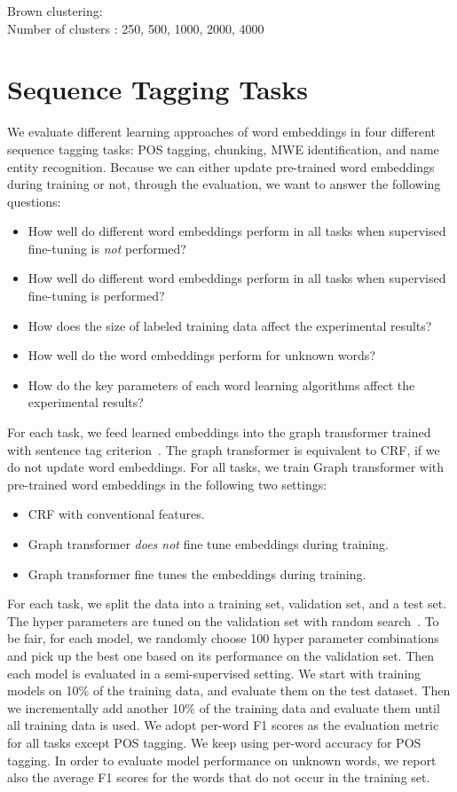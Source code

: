 \documentclass[11pt]{article}
\begin{document}
\noindent
Brown clustering:\\
\noindent
Number of clusters : 250, 500, 1000, 2000, 4000 


\section{Sequence Tagging Tasks}
We evaluate different learning approaches of word embeddings in four different sequence tagging tasks: POS tagging, chunking, MWE identification, and name entity recognition. Because we can either update pre-trained word embeddings during training or not, through the evaluation, we want to answer the following questions:
\begin{itemize}
\item How well do different word embeddings perform in all tasks when supervised fine-tuning is \textit{not} performed?
\item How well do different word embeddings perform in all tasks when supervised fine-tuning is performed?
\item How does the size of labeled training data affect the experimental results?
\item How well do the word embeddings perform for unknown words? 
\item How do the key parameters of each word learning algorithms affect the experimental results?
\end{itemize}

For each task, we feed learned embeddings into the graph transformer trained with sentence tag criterion~\cite{turian2010word}. The graph transformer is equivalent to CRF, if we do not update word embeddings. For all tasks, we train Graph transformer with pre-trained word embeddings in the following two settings: 
\begin{itemize}
\item CRF with conventional features.
\item Graph transformer \textit{does not} fine tune embeddings during training.
\item Graph transformer fine tunes the embeddings during training.
\end{itemize}
For each task, we split the data into a training set, validation set, and a test set. The hyper parameters are tuned on the validation set with random search~\cite{bergstra2012random}. To be fair, for each model, we randomly choose 100 hyper parameter combinations and pick up the best one based on its performance on the validation set. Then each model is evaluated in a semi-supervised setting. We start with training models on 10\% of the training data, and evaluate them on the test dataset. Then we incrementally add another 10\% of the training data and evaluate them until all training data is used. We adopt per-word F1 scores as the evaluation metric for all tasks except POS tagging. We keep using per-word accuracy for POS tagging. In order to evaluate model performance on unknown words, we report also the average F1 scores for the words that do not occur in the training set.
\end{document}
